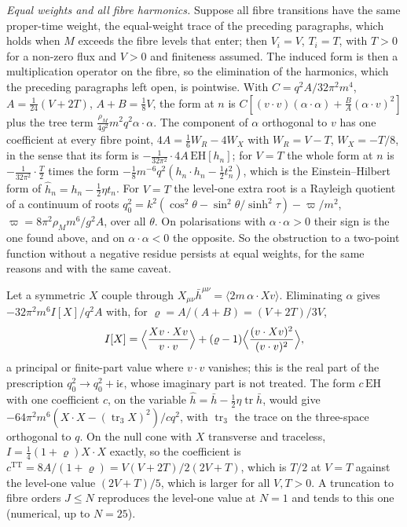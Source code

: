 \emph{Equal weights and all fibre harmonics.} Suppose all fibre transitions have the same proper-time weight, the equal-weight trace of the preceding paragraphs, which holds when \(M\) exceeds the fibre levels that enter; then \(V_i=V\), \(T_i=T\), with \(T>0\) for a non-zero flux and \(V>0\) and finiteness assumed. The induced form is then a multiplication operator on the fibre, so the elimination of the harmonics, which the preceding paragraphs left open, is pointwise. With \(C=q^2A/32\pi^2m^4\), \(A=\tfrac1{24}(V+2T)\), \(A+B=\tfrac18V\), the form at \(n\) is \(C[(v\cdot v)(\alpha\cdot\alpha)+\tfrac BA(\alpha\cdot v)^2]\) plus the tree term \(\tfrac{\rho_M}{4g^2}m^2q^2\alpha\cdot\alpha\). The component of \(\alpha\) orthogonal to \(v\) has one coefficient at every fibre point, \(4A=\tfrac16W_R-4W_X\) with \(W_R=V-T\), \(W_X=-T/8\), in the sense that its form is \(-\tfrac1{32\pi^2}\cdot4A\,\mathrm{EH}[h_n]\); for \(V=T\) the whole form at \(n\) is \(-\tfrac1{32\pi^2}\cdot\tfrac T2\) times the form \(-\tfrac18m^{-6}q^2(h_n\cdot h_n-\tfrac12t_n^2)\), which is the Einstein--Hilbert form of \(\hat h_n=h_n-\tfrac12\eta t_n\). For \(V=T\) the level-one extra root is a Rayleigh quotient of a continuum of roots \(q_0^2=k^2(\cos^2\theta-\sin^2\theta/\sinh^2\tau)-\varpi/m^2\), \(\varpi=8\pi^2\rho_Mm^6/g^2A\), over all \(\theta\). On polarisations with \(\alpha\cdot\alpha>0\) their sign is the one found above, and on \(\alpha\cdot\alpha<0\) the opposite. So the obstruction to a two-point function without a negative residue persists at equal weights, for the same reasons and with the same caveat.

Let a symmetric \(X\) couple through \(X_{\mu\nu}\bar h^{\mu\nu}=\langle2m\,\alpha\cdot Xv\rangle\). Eliminating \(\alpha\) gives \(-32\pi^2m^6I[X]/q^2A\) with, for \(\varrho=A/(A+B)=(V+2T)/3V\),
\[
I[X]=\Bigl\langle\frac{Xv\cdot Xv}{v\cdot v}\Bigr\rangle+(\varrho-1)\Bigl\langle\frac{(v\cdot Xv)^2}{(v\cdot v)^2}\Bigr\rangle,
\]
a principal or finite-part value where \(v\cdot v\) vanishes; this is the real part of the prescription \(q_0^2\to q_0^2+\mathrm i\epsilon\), whose imaginary part is not treated. The form \(c\,\mathrm{EH}\) with one coefficient \(c\), on the variable \(\hat h=\bar h-\tfrac12\eta\operatorname{tr}\bar h\), would give \(-64\pi^2m^6(X\cdot X-(\operatorname{tr}_3X)^2)/cq^2\), with \(\operatorname{tr}_3\) the trace on the three-space orthogonal to \(q\). On the null cone with \(X\) transverse and traceless, \(I=\tfrac14(1+\varrho)X\cdot X\) exactly, so the coefficient is \(c^{\mathrm{TT}}=8A/(1+\varrho)=V(V+2T)/2(2V+T)\), which is \(T/2\) at \(V=T\) against the level-one value \((2V+T)/5\), which is larger for all \(V,T>0\). A truncation to fibre orders \(J\le N\) reproduces the level-one value at \(N=1\) and tends to this one (numerical, up to \(N=25\)).

